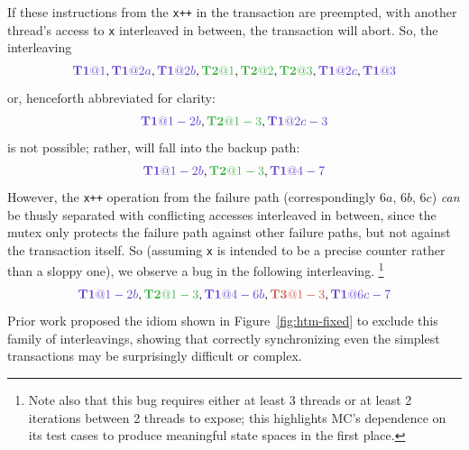 \documentclass[10pt]{sigplanconf}
\begin{document}
If these instructions from the {\tt x++} in the transaction are preempted,
with another thread's access to {\tt x} interleaved in between,
the transaction will abort.
So, the interleaving
\[
	\tiat{1}, \tiat{2a}, \tiat{2b}, \tjat{1}, \tjat{2}, \tjat{3}, \tiat{2c}, \tiat{3}
\]
or, henceforth abbreviated for clarity:
\[
	\tiat{1-2b}, \tjat{1-3}, \tiat{2c-3}
\]
is not possible; rather, \ti will fall into the backup path:
\[
	\tiat{1-2b}, \tjat{1-3}, \tiat{4-7}
\]
However, the {\tt x++} operation from the failure path (correspondingly $6a$, $6b$, $6c$)
{\em can} be thusly separated with conflicting accesses interleaved in between,
since the mutex only protects the failure path against other failure paths,
but not against the transaction itself.
So (assuming {\tt x} is intended to be a precise counter rather than a sloppy one),
we observe a bug in the following interleaving.%
\footnote{Note also that this bug requires either at least 3 threads or at least 2 iterations between 2 threads to expose;
this highlights MC's dependence on its test cases to produce meaningful state spaces in the first place.}
\[
	\tiat{1-2b}, \tjat{1-3}, \tiat{4-6b}, \tkat{1-3}, \tiat{6c-7}
\]
Prior work \cite{htm-mario} proposed the idiom shown in Figure~\ref{fig:htm-fixed}
to exclude this family of interleavings,
showing that correctly synchronizing even the simplest transactions may be surprisingly difficult or complex.
\end{document}
